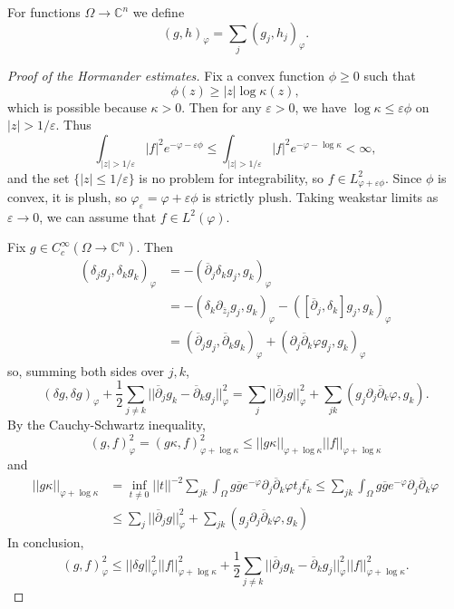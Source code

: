\documentclass[12pt]{report}
\newcommand{\CC}{\mathbb{C}}
\newcommand{\dbar}{\overline \partial}
\theoremstyle{definition}
\begin{document}
For functions $\Omega \to \CC^n$ we define
$$(g, h)_\varphi = \sum_j (g_j, h_j)_\varphi.$$
\begin{proof}[Proof of the Hormander estimates]
    Fix a convex function $\phi \geq 0$ such that
    $$\phi(z) \geq |z| \log \kappa(z),$$
    which is possible because $\kappa > 0$. Then for any $\varepsilon > 0$, we have $\log \kappa \leq \varepsilon \phi$ on $|z| > 1/\varepsilon$. Thus
    $$\int_{|z| > 1/\varepsilon} |f|^2 e^{-\varphi - \varepsilon\phi} \leq \int_{|z| > 1/\varepsilon} |f|^2 e^{-\varphi-\log\kappa} < \infty,$$
    and the set $\{|z| \leq 1/\varepsilon\}$ is no problem for integrability, so $f \in L^2_{\varphi + \varepsilon\phi}$. Since $\phi$ is convex, it is plush, so $\varphi_\varepsilon = \varphi + \varepsilon \phi$ is strictly plush. Taking weakstar limits as $\varepsilon \to 0$, we can assume that $f \in L^2(\varphi)$.
    
    Fix $g \in C^\infty_c(\Omega \to \CC^n)$. Then
    \begin{align*}
(\delta_j g_j, \delta_k g_k)_\varphi &= -(\dbar_j \delta_k g_j, g_k)_\varphi \\
&= -(\delta_k \partial_{\overline{z}_j} g_j,g_k)_\varphi - ([\dbar_j, \delta_k]g_j, g_k)_\varphi \\
&= (\dbar_j g_j, \dbar_k g_k)_\varphi + (\partial_j \dbar_k \varphi g_j, g_k)_\varphi
\end{align*}
    so, summing both sides over $j, k$,
    $$(\delta g, \delta g)_\varphi + \frac{1}{2} \sum_{j \neq k} ||\dbar_j g_k - \dbar_k g_j||_\varphi^2 = \sum_j ||\dbar_j g||_\varphi^2 + \sum_{jk} (g_j \partial_j \dbar_k \varphi, g_k).$$
    By the Cauchy-Schwartz inequality,
    $$(g, f)_\varphi^2 = (g\kappa, f)_{\varphi + \log \kappa}^2 \leq ||g\kappa||_{\varphi + \log \kappa} ||f||_{\varphi + \log \kappa}$$
    and
\begin{align*}
    ||g\kappa||_{\varphi + \log \kappa} 
        &= \inf_{t \neq 0} ||t||^{-2} \sum_{jk} \int_\Omega g\overline g e^{-\varphi} \partial_j \dbar_k \varphi t_j \overline{t_k}
        \leq \sum_{jk} \int_\Omega g\overline g e^{-\varphi} \partial_j \dbar_k \varphi\\
        &\leq \sum_j ||\dbar_j g||_\varphi^2 + \sum_{jk} (g_j\partial_j \dbar_k \varphi, g_k)
\end{align*}
    In conclusion,
$$(g, f)_\varphi^2 \leq ||\delta g||^2_\varphi ||f||_{\varphi + \log \kappa}^2 + \frac{1}{2} \sum_{j \neq k} ||\dbar_j g_k - \dbar_k g_j||_\varphi^2 ||f||_{\varphi + \log \kappa}^2.$$


\end{proof}
\end{document}
